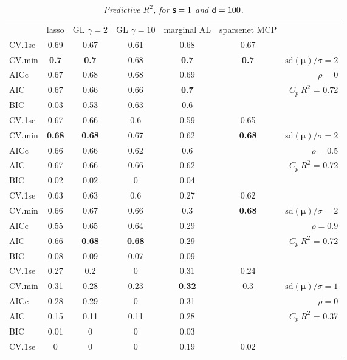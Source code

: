 \documentclass[12pt]{article}
\newcommand{\mr}[1]{\mathrm{#1}}
\newcommand{\bm}[1]{\mathbf{#1}}
\begin{document}
\begin{table}[p]\vspace{-.5cm}
\caption[l]{\label{r2}\it Predictive $R^2$, for ${\sf s}=1$ and  ${\sf d}=100$.}
\vspace{-.5cm}
\small{}
\begin{center}
\begin{tabular}{l*{5}{c}|r}
 & lasso & GL $\gamma=2$ & GL $\gamma=10$ & marginal AL & sparsenet MCP  &  \\
\cline{1-7}
CV.1se & 0.69 & 0.67 & 0.61 & 0.68 & 0.67 &\\
CV.min & {\bf 0.7} & {\bf 0.7} & 0.68 & {\bf 0.7} & {\bf 0.7} &  $\mr{sd}(\bm{\mu})/\sigma=2$ \\
AICc & 0.67 & 0.68 & 0.68 & 0.69 & & $\rho=0$ \\
AIC & 0.67 & 0.66 & 0.66 & {\bf 0.7} & & \multirow{2}{*}{$C_p ~ R^2$ = 0.72} \\
BIC & 0.03 & 0.53 & 0.63 & 0.6 & & \\
 \hline 
CV.1se & 0.67 & 0.66 & 0.6 & 0.59 & 0.65 &\\
CV.min & {\bf 0.68} & {\bf 0.68} & 0.67 & 0.62 & {\bf 0.68} &  $\mr{sd}(\bm{\mu})/\sigma=2$ \\
AICc & 0.66 & 0.66 & 0.62 & 0.6 & & $\rho=0.5$ \\
AIC & 0.67 & 0.66 & 0.66 & 0.62 & & \multirow{2}{*}{$C_p ~ R^2$ = 0.72} \\
BIC & 0.02 & 0.02 & 0 & 0.04 & & \\
 \hline 
CV.1se & 0.63 & 0.63 & 0.6 & 0.27 & 0.62 &\\
CV.min & 0.66 & 0.67 & 0.66 & 0.3 & {\bf 0.68} &  $\mr{sd}(\bm{\mu})/\sigma=2$ \\
AICc & 0.55 & 0.65 & 0.64 & 0.29 & & $\rho=0.9$ \\
AIC & 0.66 & {\bf 0.68} & {\bf 0.68} & 0.29 & & \multirow{2}{*}{$C_p ~ R^2$ = 0.72} \\
BIC & 0.08 & 0.09 & 0.07 & 0.09 & & \\
 \hline 
CV.1se & 0.27 & 0.2 & 0 & 0.31 & 0.24 &\\
CV.min & 0.31 & 0.28 & 0.23 & {\bf 0.32} & 0.3 &  $\mr{sd}(\bm{\mu})/\sigma=1$ \\
AICc & 0.28 & 0.29 & 0 & 0.31 & & $\rho=0$ \\
AIC & 0.15 & 0.11 & 0.11 & 0.28 & & \multirow{2}{*}{$C_p ~ R^2$ = 0.37} \\
BIC & 0.01 & 0 & 0 & 0.03 & & \\
 \hline 
CV.1se & 0 & 0 & 0 & 0.19 & 0.02 &\\

\end{tabular}
\end{center}
\end{table}
\end{document}
